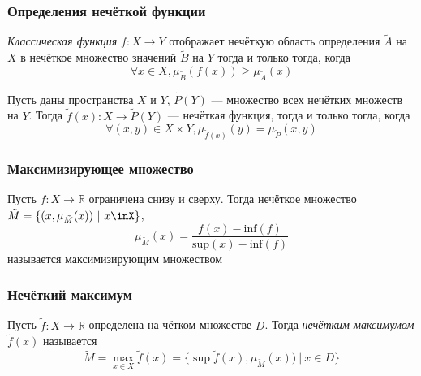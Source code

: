 \documentclass{beamer}
\begin{document}
\begin{frame}\frametitle{Определения нечёткой функции}
    \begin{definition}
        \textit{Классическая функция} $f: X \to Y$ отображает нечёткую область определения $\tilde{A}$ на $X$ в нечёткое множество значений $\tilde{B}$ на $Y$ тогда и только тогда, когда
        \[
            \forall x \in X, \mu_{\tilde{B}}(f(x)) \geq \mu_{\tilde{A}}(x)
        \]
    \end{definition}
    
    \begin{definition}
        Пусть даны пространства $X$ и $Y$, $\tilde{P}(Y)$ --- множество всех нечётких множеств на $Y$. Тогда $\tilde{f}(x): X \to \tilde{P}(Y)$ --- нечёткая функция, тогда и только тогда, когда
        \[
            \forall (x, y) \in X \times Y, \mu_{\tilde{f}(x)}(y) = \mu_{\tilde{P}}(x, y)
        \]
    \end{definition}
\end{frame}

\begin{frame}\frametitle{Максимизирующее множество}
    \begin{definition}
        Пусть $f: X \to \mathbb{R}$ ограничена снизу и сверху. Тогда нечёткое множество $\tilde{M} = \{ (x, \mu_{\tilde{M}}(x))\ |\ x\inX \}$,
        \[
            \mu_{\tilde{M}}(x) = \frac{f(x) - \mathrm{inf}(f)}{\mathrm{sup}(x) - \mathrm{inf}(f)}
        \]
        называется максимизирующим множеством
    \end{definition}
    
\end{frame}
\begin{frame}\frametitle{Нечёткий максимум}
    \begin{definition}
        Пусть $\tilde{f}: X \to \mathbb{R}$ определена на чётком множестве $D$. Тогда \textit{нечётким максимумом} $\tilde{f}(x)$ называется
        \[
            \tilde{M} = \max_{x \in X} \tilde{f}(x) = \{ \sup{\tilde{f}(x), \mu_{\tilde{M}}(x))\ |\ x \in D} \}
        \]
    \end{definition}    
\end{frame}
\end{document}
